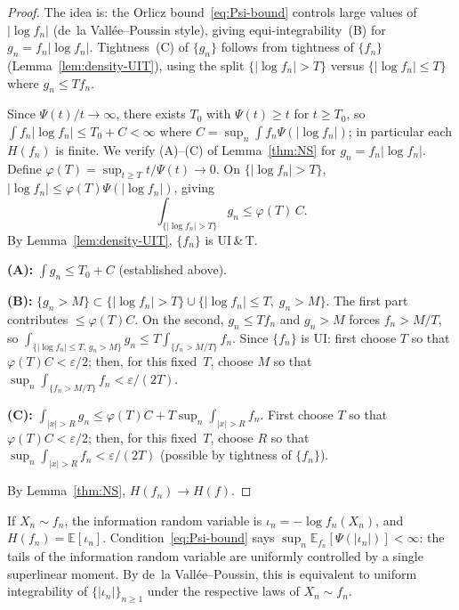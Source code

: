 \documentclass[journal]{IEEEtran}
\theoremstyle{definition}
\theoremstyle{remark}
\newcommand{\E}{\mathbb{E}}
\newcommand{\1}{\mathbf{1}}
\newcommand{\Hent}{H}
\newcommand{\abs}[1]{\lvert #1 \rvert}
\begin{document}
\begin{proof}
The idea is: the Orlicz bound~\eqref{eq:Psi-bound} controls large
values of $\abs{\log f_n}$ (de~la Vall\'{e}e--Poussin style),
giving equi-integrability~(B) for $g_n = f_n\abs{\log f_n}$.
Tightness~(C) of $\{g_n\}$ follows from tightness of $\{f_n\}$
(Lemma~\ref{lem:density-UIT}), using the split
$\{\abs{\log f_n} > T\}$ versus
$\{\abs{\log f_n} \leq T\}$ where $g_n \leq T f_n$.

Since $\Psi(t)/t \to \infty$, there exists $T_0$ with
$\Psi(t) \geq t$ for $t \geq T_0$, so
$\int f_n \abs{\log f_n} \leq T_0 + C < \infty$ where
$C = \sup_n \int f_n \Psi(\abs{\log f_n})$; in particular each
$\Hent(f_n)$ is finite.
We verify (A)--(C) of Lemma~\ref{thm:NS} for
$g_n = f_n \abs{\log f_n}$.
Define $\varphi(T) = \sup_{t \geq T} t / \Psi(t) \to 0$.  On
$\{\abs{\log f_n} > T\}$,
$\abs{\log f_n} \leq \varphi(T)\Psi(\abs{\log f_n})$, giving
\begin{equation}\label{eq:Psi-tail}
  \int_{\{\abs{\log f_n} > T\}} g_n \leq \varphi(T)\, C.
\end{equation}
By Lemma~\ref{lem:density-UIT}, $\{f_n\}$ is UI\,\&\,T.

\medskip\noindent
\textbf{(A):}\; $\int g_n \leq T_0 + C$ (established above).

\medskip\noindent
\textbf{(B):}\; $\{g_n > M\} \subset
\{\abs{\log f_n} > T\} \cup
\{\abs{\log f_n} \leq T,\; g_n > M\}$.
The first part contributes $\leq \varphi(T) C$.  On the second,
$g_n \leq T f_n$ and $g_n > M$ forces $f_n > M/T$, so
$\int_{\{\abs{\log f_n} \leq T,\, g_n > M\}} g_n
\leq T \int_{\{f_n > M/T\}} f_n$.
Since $\{f_n\}$ is UI: first choose $T$ so that
$\varphi(T) C < \varepsilon/2$; then, for this fixed~$T$,
choose $M$ so that
$\sup_n \int_{\{f_n > M/T\}} f_n < \varepsilon/(2T)$.

\medskip\noindent
\textbf{(C):}\;
$\int_{\abs{x}>R} g_n
\leq \varphi(T) C + T \sup_n \int_{\abs{x}>R} f_n$.
First choose $T$ so that $\varphi(T) C < \varepsilon/2$;
then, for this fixed~$T$, choose $R$ so that
$\sup_n \int_{\abs{x}>R} f_n < \varepsilon/(2T)$
(possible by tightness of $\{f_n\}$).

\medskip
By Lemma~\ref{thm:NS}, $\Hent(f_n) \to \Hent(f)$.
\end{proof}

If $X_n \sim f_n$, the information random variable is
$\iota_n = -\log f_n(X_n)$, and $\Hent(f_n) = \E[\iota_n]$.
Condition~\eqref{eq:Psi-bound} says
$\sup_n \E_{f_n}[\Psi(\abs{\iota_n})] < \infty$: the tails of the
information random variable are uniformly controlled by a single
superlinear moment.  By de~la Vall\'{e}e--Poussin, this is
equivalent to uniform integrability of
$\{\abs{\iota_n}\}_{n \geq 1}$ under the respective laws of
$X_n \sim f_n$.
\end{document}
